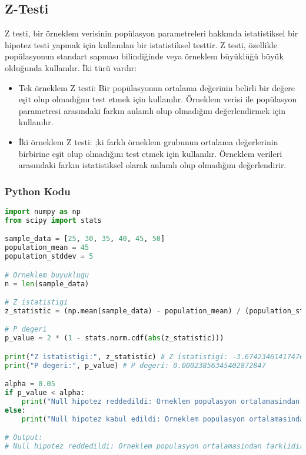 \newpage

\subsection{Z-Testi}
Z testi, bir örneklem verisinin popülasyon parametreleri hakkında istatistiksel bir hipotez testi yapmak için kullanılan bir istatistiksel testtir. Z testi, özellikle popülasyonun standart sapması bilindiğinde veya örneklem büyüklüğü büyük olduğunda kullanılır. İki türü vardır:

\begin{itemize}
    \item Tek örneklem Z testi: Bir popülasyonun ortalama değerinin belirli bir değere eşit olup olmadığını test etmek için kullanılır. Örneklem verisi ile popülasyon parametresi arasındaki farkın anlamlı olup olmadığını değerlendirmek için kullanılır.
    \item İki örneklem Z testi: ;ki farklı örneklem grubunun ortalama değerlerinin birbirine eşit olup olmadığını test etmek için kullanılır. Örneklem verileri arasındaki farkın istatistiksel olarak anlamlı olup olmadığını değerlendirir.
\end{itemize}

\subsubsection{Python Kodu}

\begin{lstlisting}[language=Python]
import numpy as np
from scipy import stats

sample_data = [25, 30, 35, 40, 45, 50]
population_mean = 45
population_stddev = 5

# Orneklem buyuklugu
n = len(sample_data)

# Z istatistigi
z_statistic = (np.mean(sample_data) - population_mean) / (population_stddev / np.sqrt(n))

# P degeri
p_value = 2 * (1 - stats.norm.cdf(abs(z_statistic)))

print("Z istatistigi:", z_statistic) # Z istatistigi: -3.674234614174767
print("P degeri:", p_value) # P degeri: 0.00023856345402872847

alpha = 0.05
if p_value < alpha:
    print("Null hipotez reddedildi: Orneklem populasyon ortalamasindan farklidir.")
else:
    print("Null hipotez kabul edildi: Orneklem populasyon ortalamasindan farkli degildir.")

# Output:
# Null hipotez reddedildi: Orneklem populasyon ortalamasindan farklidir.
\end{lstlisting}

